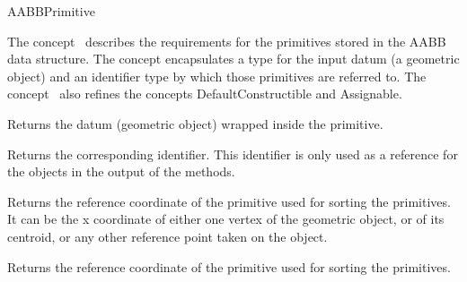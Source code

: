 \ccRefPageBegin


\begin{ccRefConcept}{AABBPrimitive}


\ccDefinition
  
The concept \ccRefName\ describes the requirements for the primitives stored in the AABB data structure. The concept encapsulates a type for the input datum (a geometric object) and an identifier type by which those primitives are referred to. The concept \ccRefName\ also refines the concepts DefaultConstructible and Assignable.

\ccTypes







\ccOperations

{Returns the datum (geometric object) wrapped inside the primitive.}

{Returns the corresponding identifier. This identifier is only used as a reference for the objects in the output of the  methods.}

{Returns the  reference coordinate of the primitive used for sorting the primitives. It can be the x coordinate of either one vertex of the geometric object, or of its centroid, or any other reference point taken on the object.}

{Returns the  reference coordinate of the primitive used for sorting the primitives.}


\end{ccRefConcept}
